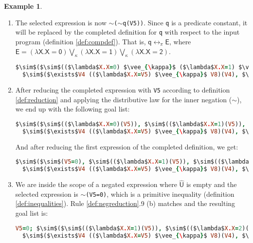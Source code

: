 \documentclass[inscr,ack,preface]{dithesis}
\theoremstyle{definition}
\newtheorem{example}{Example}[chapter]
\newcommand{\msf}[1]{$\mathsf{#1}$}
\begin{document}
\begin{example}
\begin{enumerate}
\item The selected expression is now \texttt{$\sim$($\sim$q(V5))}. Since \texttt{q} is a predicate constant, it will be replaced by the completed definition for \texttt{q} with respect to the input program (definition \ref{def:compdef}). That is, \msf{q \leftrightarrow_{\pi} E}, where \msf{E = (\lambda X. X=0) \bigvee_{\kappa} (\lambda X. X=1) \bigvee_{\kappa} (\lambda X. X=2)}.
\begin{lstlisting}[language=Prolog,%
  frame=single,breaklines=false,mathescape=true]
  $\sim$($\sim$(($\lambda$X.X=0) $\vee_{\kappa}$ ($\lambda$X.X=1) $\vee_{\kappa}$ ($\lambda$X.X=2))(V5)),
  $\sim$($\exists$V4 (($\lambda$X.X=V5) $\vee_{\kappa}$ V8)(V4), $\sim$q(V4)) ?
\end{lstlisting}

\item After reducing the completed expression with \texttt{V5} according to definition \ref{def:reduction} and applying the distributive law for the inner negation ($\sim$), we end up with the following goal list:
\begin{lstlisting}[language=Prolog,%
  frame=single,breaklines=false,mathescape=true]
  $\sim$($\sim$(($\lambda$X.X=0)(V5)), $\sim$(($\lambda$X.X=1)(V5)), $\sim$(($\lambda$X.X=2)(V5))),
  $\sim$($\exists$V4 (($\lambda$X.X=V5) $\vee_{\kappa}$ V8)(V4), $\sim$q(V4)) ?
\end{lstlisting}
And after reducing the first expression of the completed definition, we get:
\begin{lstlisting}[language=Prolog,%
  frame=single,breaklines=false,mathescape=true]
  $\sim$($\sim$(V5=0), $\sim$(($\lambda$X.X=1)(V5)), $\sim$(($\lambda$X.X=2)(V5))),
  $\sim$($\exists$V4 (($\lambda$X.X=V5) $\vee_{\kappa}$ V8)(V4), $\sim$q(V4)) ?
\end{lstlisting}

\item We are inside the scope of a negated expression where \msf{\widehat{U}} is empty and the selected expression is \texttt{$\sim$(V5=0)}, which is a primitive inequality (definition \ref{def:inequalities}). Rule \ref{def:negreduction}.9 (b) matches and the resulting goal list is:
\begin{lstlisting}[language=Prolog,%
  frame=single,breaklines=false,mathescape=true]
  V5=0; $\sim$($\sim$(($\lambda$X.X=1)(V5)), $\sim$(($\lambda$X.X=2)(V5))),
  $\sim$($\exists$V4 (($\lambda$X.X=V5) $\vee_{\kappa}$ V8)(V4), $\sim$q(V4)) ?
\end{lstlisting}


\end{enumerate}
\end{example}
\end{document}
